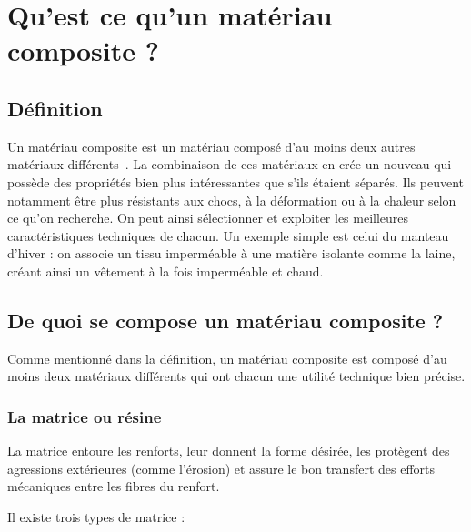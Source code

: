 

\chapter{Qu'est ce qu'un matériau composite ?}


\section{Définition}

Un matériau composite est un matériau composé d'au moins deux autres matériaux différents~\cite{polyvia}.
La combinaison de ces matériaux en crée un nouveau qui possède des propriétés bien plus intéressantes que s’ils étaient séparés.
Ils peuvent notamment être plus résistants aux chocs, à la déformation ou à la chaleur selon ce qu’on recherche.
On peut ainsi sélectionner et exploiter les meilleures caractéristiques techniques de chacun.
Un exemple simple est celui du manteau d'hiver : on associe un tissu imperméable à une matière isolante comme la laine, créant ainsi un vêtement à la fois imperméable et chaud.


\section{De quoi se compose un matériau composite ?}
Comme mentionné dans la définition, un matériau composite est composé d'au moins deux matériaux différents qui ont chacun une utilité technique bien précise.

\subsection{La matrice ou résine}
La matrice entoure les renforts, leur donnent la forme désirée, les protègent des agressions extérieures (comme l’érosion) et assure le bon transfert des efforts mécaniques entre les fibres du renfort.


Il existe trois types de matrice :



